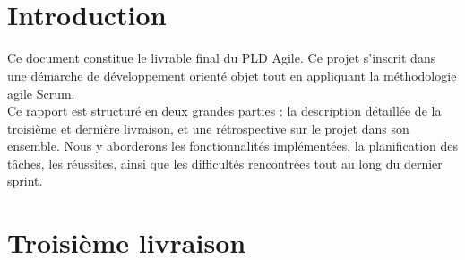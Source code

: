 \documentclass[a4paper]{article}
\begin{document}
\newcommand{\HRule}{\rule{\linewidth}{0.5mm}}



~
\thispagestyle{empty}

\tableofcontents
\thispagestyle{empty}
\setcounter{page}{0}

\renewcommand{\arraystretch}{1.5}

~
\thispagestyle{empty}
\setcounter{page}{0}


\section{Introduction} \label{ch1}
Ce document constitue le livrable final du PLD Agile. Ce projet s’inscrit dans une démarche de développement orienté objet tout en appliquant la méthodologie agile Scrum. \\
\newline
\indent Ce rapport est structuré en deux grandes parties : la description détaillée de la troisième et dernière livraison, et une rétrospective sur le projet dans son ensemble. Nous y aborderons les fonctionnalités implémentées, la planification des tâches, les réussites, ainsi que les difficultés rencontrées tout au long du dernier sprint.


\section{Troisième livraison}
\end{document}
